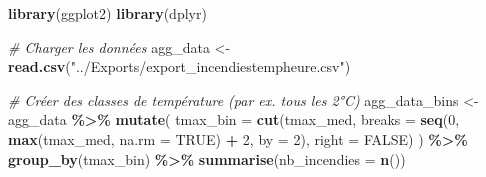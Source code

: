 \documentclass[
]{article}
\newenvironment{Shaded}{\begin{snugshade}}{\end{snugshade}}
\newcommand{\AttributeTok}[1]{\textcolor[rgb]{0.13,0.29,0.53}{#1}}
\newcommand{\CommentTok}[1]{\textcolor[rgb]{0.56,0.35,0.01}{\textit{#1}}}
\newcommand{\ConstantTok}[1]{\textcolor[rgb]{0.56,0.35,0.01}{#1}}
\newcommand{\DecValTok}[1]{\textcolor[rgb]{0.00,0.00,0.81}{#1}}
\newcommand{\FunctionTok}[1]{\textcolor[rgb]{0.13,0.29,0.53}{\textbf{#1}}}
\newcommand{\NormalTok}[1]{#1}
\newcommand{\OtherTok}[1]{\textcolor[rgb]{0.56,0.35,0.01}{#1}}
\newcommand{\SpecialCharTok}[1]{\textcolor[rgb]{0.81,0.36,0.00}{\textbf{#1}}}
\newcommand{\StringTok}[1]{\textcolor[rgb]{0.31,0.60,0.02}{#1}}
\begin{document}
\begin{Shaded}
\begin{Highlighting}[]
\FunctionTok{library}\NormalTok{(ggplot2)}
\FunctionTok{library}\NormalTok{(dplyr)}

\CommentTok{\# Charger les données}
\NormalTok{agg\_data }\OtherTok{\textless{}{-}} \FunctionTok{read.csv}\NormalTok{(}\StringTok{"../Exports/export\_incendiestempheure.csv"}\NormalTok{)}

\CommentTok{\# Créer des classes de température (par ex. tous les 2°C)}
\NormalTok{agg\_data\_bins }\OtherTok{\textless{}{-}}\NormalTok{ agg\_data }\SpecialCharTok{\%\textgreater{}\%}
  \FunctionTok{mutate}\NormalTok{(}
    \AttributeTok{tmax\_bin =} \FunctionTok{cut}\NormalTok{(tmax\_med, }\AttributeTok{breaks =} \FunctionTok{seq}\NormalTok{(}\DecValTok{0}\NormalTok{, }\FunctionTok{max}\NormalTok{(tmax\_med, }\AttributeTok{na.rm =} \ConstantTok{TRUE}\NormalTok{) }\SpecialCharTok{+} \DecValTok{2}\NormalTok{, }\AttributeTok{by =} \DecValTok{2}\NormalTok{), }\AttributeTok{right =} \ConstantTok{FALSE}\NormalTok{)}
\NormalTok{  ) }\SpecialCharTok{\%\textgreater{}\%}
  \FunctionTok{group\_by}\NormalTok{(tmax\_bin) }\SpecialCharTok{\%\textgreater{}\%}
  \FunctionTok{summarise}\NormalTok{(}\AttributeTok{nb\_incendies =} \FunctionTok{n}\NormalTok{())}


\end{Highlighting}
\end{Shaded}
\end{document}
